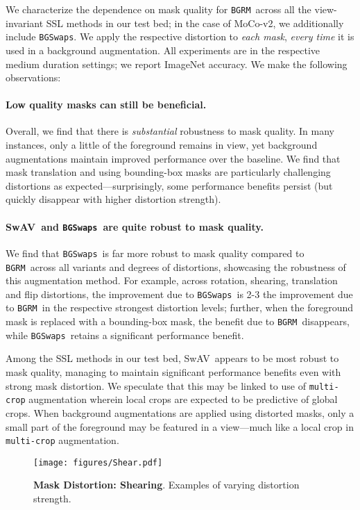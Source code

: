 \documentclass[twoside,11pt]{article}
\newcommand{\bgrm}{\texttt{BG\textunderscore RM}}
\newcommand{\bgswaps}{\texttt{BG\textunderscore Swaps}}
\newcommand{\moco}{MoCo-v2}
\newcommand{\swav}{SwAV}
\begin{document}
 We characterize the dependence on mask quality for \bgrm~across all the view-invariant SSL methods in our test bed; in the case of \moco, we additionally include \bgswaps. We apply the respective distortion to \textit{each mask}, \textit{every time} it is used in a background augmentation. All experiments are in the respective medium duration settings; we report ImageNet accuracy. We make the following observations:

\paragraph{Low quality masks can still be beneficial.} Overall, we find that there is \textit{substantial} robustness to mask quality. In many instances, only a little of the foreground remains in view, yet background augmentations maintain improved performance over the baseline. We find that mask translation and using bounding-box masks are particularly challenging distortions as expected---surprisingly, some performance benefits persist (but quickly disappear with higher distortion strength). 

\paragraph{\swav~and \bgswaps~are quite robust to mask quality.} 
We find that \bgswaps~is far more robust to mask quality compared to \bgrm~across all variants and degrees of distortions, showcasing the robustness of this augmentation method. For example, across rotation, shearing, translation and flip distortions, the improvement due to \bgswaps~is 2-3 the improvement due to \bgrm~in the respective strongest distortion levels; further, when the foreground mask is replaced with a bounding-box mask, the benefit due to \bgrm~disappears, while \bgswaps~retains a significant performance benefit.

Among the SSL methods in our test bed, \swav~appears to be most robust to mask quality, managing to maintain significant performance benefits even with strong mask distortion. We speculate that this may be linked to use of  \texttt{multi-crop} augmentation wherein local crops are expected to be predictive of global crops. When background augmentations are applied using distorted masks, only a small part of the foreground may be featured in a view---much like a local crop in \texttt{multi-crop} augmentation.



\begin{figure}
    \centering
    \texttt{[image: figures/Shear.pdf]}
    \caption{{\bf Mask Distortion: Shearing}. Examples of varying distortion strength.}
    \label{fig: shear}
\end{figure}
\end{document}
